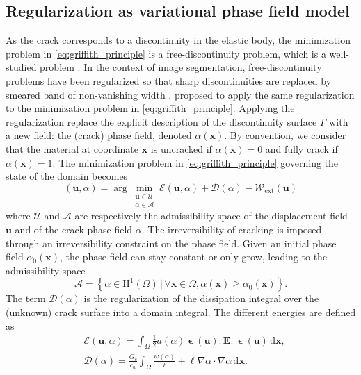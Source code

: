 \documentclass[OptSoft]{jtcam_preprint}
\newcommand{\xx}{\bm{x}}
\newcommand{\dx}{\,\mathrm{d}\xx}
\newcommand{\uu}{\bm{u}}
\newcommand{\ela}{\mathbf{E}}
\newcommand{\eps}{\bm{\upvarepsilon}}
\begin{document}
\subsection{Regularization as variational phase field model}
As the crack corresponds to a discontinuity in the elastic body, the minimization problem in \cref{eq:griffith_principle} is a free-discontinuity problem, which is a well-studied problem \parencite{ambrosio_functions_2000}.
In the context of image segmentation, free-discontinuity problems have been regularized so that sharp discontinuities are replaced by smeared band of non-vanishing width \parencite{mumford_optimal_1989, ambrosio_approximation_1992}.
\textcite{francfort_revisiting_1998} proposed to apply the same regularization to the minimization problem in \cref{eq:griffith_principle}.
Applying the regularization replace the explicit description of the discontinuity surface $\Gamma$ with a new field: the (crack) phase field, denoted $\alpha(\xx)$.
By convention, we consider that the material at coordinate $\xx$ is uncracked if $\alpha(\xx)=0$ and fully crack if $\alpha(\xx) = 1$.
The minimization problem in \cref{eq:griffith_principle} governing the state of the domain becomes
\begin{equation}
  \label{eq:phase field_minimization}
  (\uu, \alpha) = \arg\min_{\substack{\uu \in \mathcal{U} \\ \alpha \in \mathcal{A}}}
  \mathcal{E}(\uu, \alpha) + \mathcal{D}(\alpha) - \mathcal{W}_{\mathrm{ext}} (\uu)
\end{equation}
where $\mathcal{U}$ and $\mathcal{A}$ are respectively the admissibility space of the displacement field $\uu$ and of the crack phase field $\alpha$.
The irreversibility of cracking is imposed through an irreversibility constraint on the phase field.
Given an initial phase field $\alpha_0(\xx)$, the phase field can stay constant or only grow, leading to the admissibility space
\begin{equation}
  \mathcal{A} = \left\{ \alpha \in \mathrm{H}^1(\Omega) \,\vert\, \forall \xx \in \Omega, \alpha(\xx) \geq \alpha_0(\xx) \right\}.
\end{equation}
The term $\mathcal{D}(\alpha)$ is the regularization of the dissipation integral over the (unknown) crack surface into a domain integral.
The different energies are defined as
\begin{equation}
  \begin{split}
    &\mathcal{E}(\uu, \alpha) = \int_\Omega \frac{1}{2} a(\alpha) \eps(\uu) : \ela : \eps(\uu) \dx
    , \\
    &\mathcal{D}(\alpha) = \frac{G_c}{c_w} \int_\Omega \frac{w(\alpha)}{\ell} + \ell \nabla \alpha \cdot \nabla \alpha \dx
    . \\
  \end{split}
\end{equation}
\end{document}
